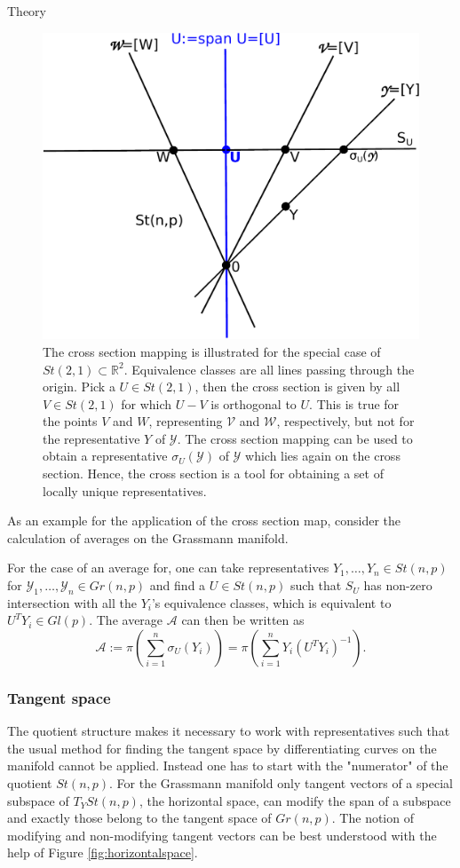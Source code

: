 \begin{chapter}{Theory}
\begin{figure}[h!]
        \centering
	    \includegraphics[width=0.5\linewidth]{./figures/theory/affinecrosssection.pdf}
	\caption[Affine cross section map]{ The cross section mapping is illustrated for the special
	case of $St(2,1)\subset\mathbb{R}^2$. Equivalence classes are all lines passing through the origin.
	Pick a $U\in St(2,1)$, then the cross section is given by all $V\in St(2,1)$ for which $U-V$ is
	orthogonal to $U$. This is true for the points $V$ and $W$, representing $\mathcal{V}$ and $\mathcal{W}$,
	respectively, but not for the representative $Y$ of $\mathcal{Y}$. 
	The cross section mapping can be used to obtain a representative $\sigma_U(\mathcal{Y})$ of $\mathcal{Y}$
	which lies again on the cross section. Hence, the cross section is a tool for obtaining a set 
	of locally unique representatives.	
	}
	\label{fig:crosssection}
\end{figure}
As an example for the application of the cross section map, consider the calculation of averages on the
Grassmann manifold. 
\begin{example}[Average]
For the case of an average for, one can take representatives $Y_1,\ldots,Y_n\in St(n,p)$ for $\mathcal{Y}_1,\ldots,\mathcal{Y}_n\in Gr(n,p)$
and find a $U\in St(n,p)$ such that $S_U$ has non-zero intersection with all the $Y_i$'s equivalence classes, which is equivalent
to $U^TY_i\in Gl(p)$. The average $\mathcal{A}$ can then be written as
\begin{equation}
    \mathcal{A} := \pi\left(\sum_{i=1}^{n}\sigma_U(Y_i)\right)=\pi\left(\sum_{i=1}^{n}Y_i(U^{T}Y_i)^{-1}\right).
\end{equation}
\end{example}

\subsubsection{Tangent space} %
\label{ssub:Tangent space}
The quotient structure makes it necessary to work with representatives such that the usual method for finding the tangent space by differentiating
curves on the manifold cannot be applied. 
Instead one has to start with the "numerator" of the quotient $St(n,p)$. For the Grassmann manifold only tangent vectors of a special subspace of $T_YSt(n,p)$,
the horizontal space, can modify the span of a subspace and exactly those belong to the tangent space of $Gr(n,p)$. 
The notion of modifying and non-modifying tangent vectors can be best understood with the help of Figure \ref{fig:horizontalspace}.\\


\end{chapter}

